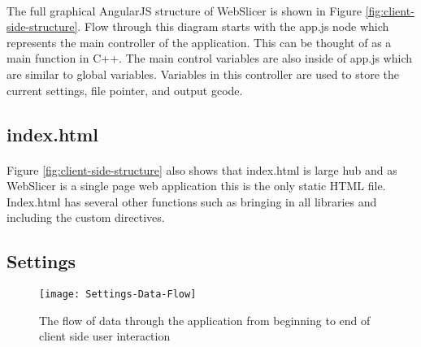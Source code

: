\paragraph{}
The full graphical AngularJS structure of WebSlicer is shown in Figure \ref{fig:client-side-structure}.
Flow through this diagram starts with the app.js node which represents the main controller of the application.
This can be thought of as a main function in C++.
The main control variables are also inside of app.js which are similar to global variables.
Variables in this controller are used to store the current settings, file pointer, and output gcode.

\subsection{index.html}%
\paragraph{}
Figure \ref{fig:client-side-structure} also shows that index.html is large hub and as WebSlicer is a single page web application this is the only static HTML file.
Index.html has several other functions such as bringing in all libraries and including the custom directives.

\subsection{Settings}%
\begin{figure}[!ht]
  \centering
  \texttt{[image: Settings-Data-Flow]}
  \caption{The flow of data through the application from beginning to end of client side user interaction}
  \label{fig:settings-data-flow}
\end{figure}
